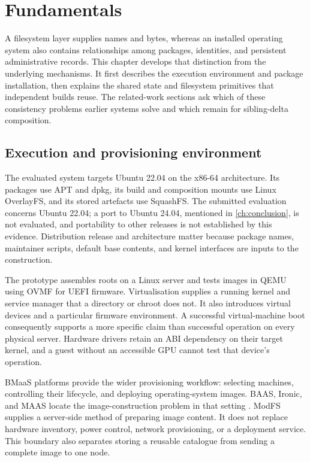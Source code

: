 \chapter{Fundamentals}
\label{ch:fundamentals}

A filesystem layer supplies names and bytes, whereas an installed operating system also contains relationships among packages, identities, and persistent administrative records. This chapter develops that distinction from the underlying mechanisms. It first describes the execution environment and package installation, then explains the shared state and filesystem primitives that independent builds reuse. The related-work sections ask which of these consistency problems earlier systems solve and which remain for sibling-delta composition.

\section{Execution and provisioning environment}
The evaluated system targets Ubuntu \num{22.04} on the x86-64 architecture. Its packages use \ac{APT} and dpkg, its build and composition mounts use Linux OverlayFS, and its stored artefacts use SquashFS. The submitted evaluation concerns Ubuntu \num{22.04}; a port to Ubuntu \num{24.04}, mentioned in \cref{ch:conclusion}, is not evaluated, and portability to other releases is not established by this evidence. Distribution release and architecture matter because package names, maintainer scripts, default base contents, and kernel interfaces are inputs to the construction.

The prototype assembles roots on a Linux server and tests images in \ac{QEMU} using \ac{OVMF} for \ac{UEFI} firmware. Virtualisation supplies a running kernel and service manager that a directory or chroot does not. It also introduces virtual devices and a particular firmware environment. A successful virtual-machine boot consequently supports a more specific claim than successful operation on every physical server. Hardware drivers retain an \ac{ABI} dependency on their target kernel, and a guest without an accessible \ac{GPU} cannot test that device's operation.

\ac{BMaaS} platforms provide the wider provisioning workflow: selecting machines, controlling their lifecycle, and deploying operating-system images. BAAS, Ironic, and MAAS locate the image-construction problem in that setting \autocite{baas,ironic,maas}. ModFS supplies a server-side method of preparing image content. It does not replace hardware inventory, power control, network provisioning, or a deployment service. This boundary also separates storing a reusable catalogue from sending a complete image to one node.

